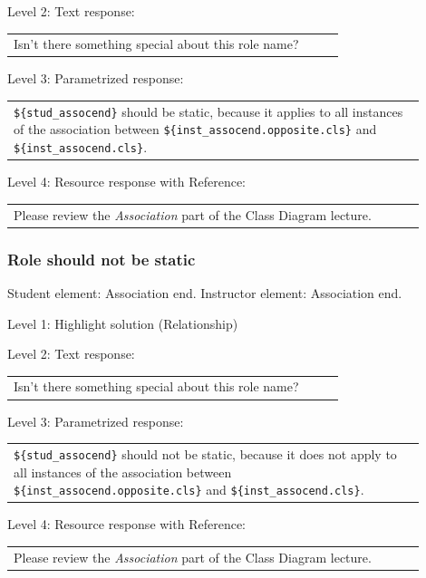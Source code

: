 \noindent Level 2: Text response: \medskip

\begin{tabular}{|p{0.9\linewidth}}
Isn't there something special about this role name?
\end{tabular} \medskip

\noindent Level 3: Parametrized response: \medskip

\begin{tabular}{|p{0.9\linewidth}}
\verb|${stud_assocend}| should be static, because it applies to all instances of the association between \verb|${inst_assocend.opposite.cls}| and \verb|${inst_assocend.cls}|.
\end{tabular} \medskip

\noindent Level 4: Resource response with Reference: \medskip

\begin{tabular}{|p{0.9\linewidth}}
Please review the \textit{Association} part of the Class Diagram lecture.
\end{tabular} \medskip


\subsubsection{Role should not be static}

Student element: Association end. Instructor element: Association end. \medskip

\noindent Level 1: Highlight solution (Relationship) \medskip

\noindent Level 2: Text response: \medskip

\begin{tabular}{|p{0.9\linewidth}}
Isn't there something special about this role name?
\end{tabular} \medskip

\noindent Level 3: Parametrized response: \medskip

\begin{tabular}{|p{0.9\linewidth}}
\verb|${stud_assocend}| should not be static, because it does not apply to all instances of the association between \verb|${inst_assocend.opposite.cls}| and \verb|${inst_assocend.cls}|.
\end{tabular} \medskip

\noindent Level 4: Resource response with Reference: \medskip

\begin{tabular}{|p{0.9\linewidth}}
Please review the \textit{Association} part of the Class Diagram lecture.
\end{tabular} \medskip


